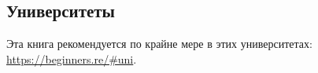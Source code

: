 \subsection*{Университеты}

Эта книга рекомендуется по крайне мере в этих университетах:
\url{https://beginners.re/\#uni}.

